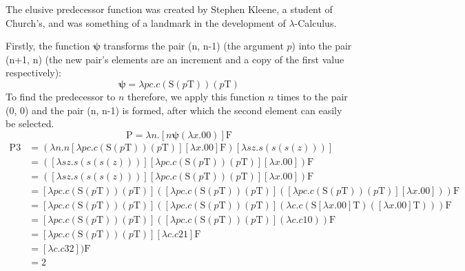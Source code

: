 \documentclass[Master.tex]{subfiles}
\begin{document}
The elusive predecessor function was created by Stephen Kleene, a student of Church's, and was something of a landmark in the development of $\lambda$-Calculus.

Firstly, the function $\bm{\psi}$ transforms the pair (n, n-1) (the argument $p$) into the pair (n+1, n) (the new pair's elements are an increment and a copy of the first value respectively):
\cite{rojas2015lambdatutorial}
\begin{equation*}
\bm{\psi} = \lambda pc.c(\bm{\mathrm{S}}(p\bm{\mathrm{T}}))(p\bm{\mathrm{T}})
\end{equation*}
To find the predecessor to $n$ therefore, we apply this function $n$ times to the pair (0, 0) and the pair (n, n-1) is formed, after which the second element can easily be selected.
\cite{rojas2015lambdatutorial}
\begin{equation*}
\bm{\mathrm{P}} = \lambda n.[n \bm{\psi} (\lambda x.\bm{\mathrm{00}})] \bm{\mathrm{F}} 
\end{equation*}
\begin{equation*}
\begin{aligned}
\bm{\mathrm{P3}} &= (\lambda n.n [\lambda pc.c(\bm{\mathrm{S}}(p\bm{\mathrm{T}}))(p\bm{\mathrm{T}})] [\lambda x.\bm{\mathrm{00}}] \bm{\mathrm{F}}) [\lambda sz.s(s(s(z)))]\\
&= ([\lambda sz.s(s(s(z)))] [\lambda pc.c(\bm{\mathrm{S}}(p\bm{\mathrm{T}}))(p\bm{\mathrm{T}})] [\lambda x.\bm{\mathrm{00}}]) \bm{\mathrm{F}}\\
&= ([\lambda sz.s(s(s(z)))] [\lambda pc.c(\bm{\mathrm{S}}(p\bm{\mathrm{T}}))(p\bm{\mathrm{T}})] [\lambda x.\bm{\mathrm{00}}]) \bm{\mathrm{F}}\\
&= [\lambda pc.c(\bm{\mathrm{S}}(p\bm{\mathrm{T}}))(p\bm{\mathrm{T}})]([\lambda pc.c(\bm{\mathrm{S}}(p\bm{\mathrm{T}}))(p\bm{\mathrm{T}})]([\lambda pc.c(\bm{\mathrm{S}}(p\bm{\mathrm{T}}))(p\bm{\mathrm{T}})][\lambda x.\bm{\mathrm{00}}]))\bm{\mathrm{F}}\\
&= [\lambda pc.c(\bm{\mathrm{S}}(p\bm{\mathrm{T}}))(p\bm{\mathrm{T}})]([\lambda pc.c(\bm{\mathrm{S}}(p\bm{\mathrm{T}}))(p\bm{\mathrm{T}})](\lambda c.c(\bm{\mathrm{S}}[\lambda x.\bm{\mathrm{00}}]\bm{\mathrm{T}})([\lambda x.\bm{\mathrm{00}}]\bm{\mathrm{T}})))\bm{\mathrm{F}}\\
&= [\lambda pc.c(\bm{\mathrm{S}}(p\bm{\mathrm{T}}))(p\bm{\mathrm{T}})]([\lambda pc.c(\bm{\mathrm{S}}(p\bm{\mathrm{T}}))(p\bm{\mathrm{T}})](\lambda c.c\bm{\mathrm{10}}))\bm{\mathrm{F}}\\
&= [\lambda pc.c(\bm{\mathrm{S}}(p\bm{\mathrm{T}}))(p\bm{\mathrm{T}})][\lambda c.c\bm{\mathrm{21}}]\bm{\mathrm{F}}\\
&= [\lambda c.c\bm{\mathrm{32}} ])\bm{\mathrm{F}}\\
&= \bm{\mathrm{2}}
\end{aligned}
\end{equation*}
\end{document}
